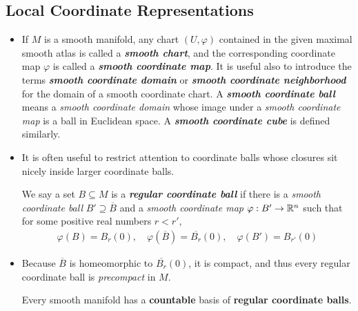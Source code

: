 \documentclass[11pt]{article}
\begin{document}
\subsection{Local Coordinate Representations}
\begin{itemize}
\item \begin{definition}
If $M$ is a smooth manifold, any chart $(U, \varphi)$ contained in the given maximal smooth atlas is called a \emph{\textbf{smooth chart}}, and the corresponding coordinate map $\varphi$ is called a \emph{\textbf{smooth coordinate map}}. It is useful also to introduce the terms \emph{\textbf{smooth coordinate domain}} or \emph{\textbf{smooth coordinate neighborhood}} for the domain of a smooth coordinate chart. A \emph{\textbf{smooth coordinate ball}} means a \emph{smooth coordinate domain} whose image under a \emph{smooth coordinate map} is a ball in Euclidean space. A \emph{\textbf{smooth coordinate cube}} is defined similarly.
\end{definition}

\item It is often useful to restrict attention to coordinate balls whose closures sit nicely inside larger coordinate balls. 
\begin{definition}
We say a set $B \subseteq M$ is a \emph{\textbf{regular coordinate ball}} if there is a \emph{smooth coordinate ball} $B' \supseteq \overline{B}$ and a \emph{smooth coordinate map} $\varphi: B' \rightarrow {\mathbb R}^n$ such that for some positive real numbers $r < r'$,
\begin{align*}
\varphi(B) = B_{r}(0), \quad \varphi(\overline{B}) = \overline{B_{r}}(0), \quad \varphi(B') = B_{r'}(0)
\end{align*}
\end{definition}

\item Because $\overline{B}$ is homeomorphic to $\overline{B_{r}}(0)$, it is compact, and thus every regular coordinate ball is \emph{precompact} in $M$.
\begin{proposition}
Every smooth manifold has a \textbf{countable} basis of \textbf{regular coordinate balls}.
\end{proposition}


\end{itemize}
\end{document}
